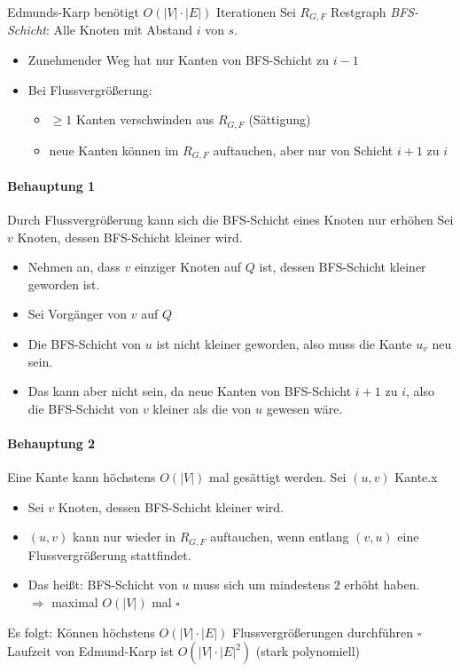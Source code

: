\Satz Edmunds-Karp benötigt $O(|V| \cdot |E|)$ Iterationen
\Bew Sei $R_{G,F}$ Restgraph
\Defi \emph{BFS-Schicht}: Alle Knoten mit Abstand $i$ von $s$.
\begin{itemize}
\item   Zunehmender Weg hat nur Kanten von BFS-Schicht zu $i-1$
\item   Bei Flussvergrößerung:
    \begin{itemize}
    \item   $\geq 1$ Kanten verschwinden aus $R_{G,F}$ (Sättigung)
    \item   neue Kanten können im $R_{G,F}$ auftauchen, aber nur von Schicht $i+1$ zu $i$
    \end{itemize}
\end{itemize}

\paragraph*{Behauptung 1} Durch Flussvergrößerung kann sich die BFS-Schicht eines Knoten nur erhöhen
\Bew Sei $v$ Knoten, dessen BFS-Schicht kleiner wird.
\begin{itemize}
\item   Nehmen an, dass $v$ einziger Knoten auf $Q$ ist, dessen BFS-Schicht kleiner geworden ist.
\item   Sei Vorgänger von $v$ auf $Q$
\item   Die BFS-Schicht von $u$ ist nicht kleiner geworden, also muss die Kante $u_v$ neu sein.
\item   Das kann aber nicht sein, da neue Kanten von BFS-Schicht $i+1$ zu $i$, also die BFS-Schicht von $v$ kleiner als die von $u$ gewesen wäre. 
\end{itemize}
\paragraph*{Behauptung 2} Eine Kante kann höchstens $O(|V|)$ mal gesättigt werden.
\Bew Sei $(u,v)$ Kante.x
\begin{itemize}
 \item Sei $v$ Knoten, dessen BFS-Schicht kleiner wird.
 \item $(u,v)$ kann nur wieder in $R_{G,F}$ auftauchen, wenn entlang $(v,u)$ eine Flussvergrößerung stattfindet.
 \item Das heißt: BFS-Schicht von $u$ muss sich um mindestens $2$ erhöht haben. \\
     $\Rightarrow$ maximal $O(|V|)$ mal \hfill $\square$
\end{itemize}
Es folgt: Können höchstens $O(|V| \cdot |E|)$ Flussvergrößerungen durchführen \hfill $\square$\\
Laufzeit von Edmund-Karp ist $O(|V| \cdot |E|^2)$ (stark polynomiell)


